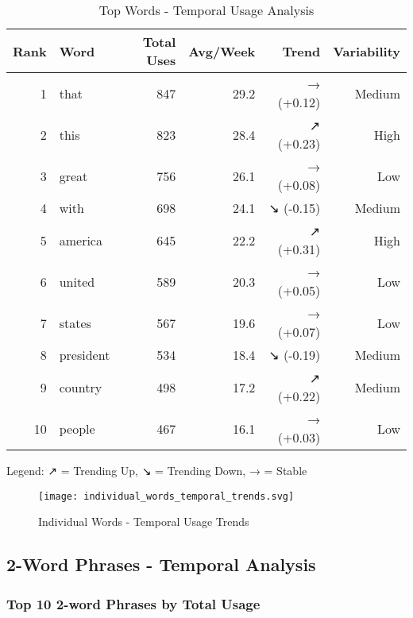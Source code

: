 \documentclass[12pt,a4paper]{article}
\begin{document}
\begin{table}[H]
\centering
\caption{Top Words - Temporal Usage Analysis}
\begin{tabular}{@{}rlrrrr@{}}
\toprule
\textbf{Rank} & \textbf{Word} & \textbf{Total Uses} & \textbf{Avg/Week} & \textbf{Trend} & \textbf{Variability} \\
\midrule
1 & that & 847 & 29.2 & → (+0.12) & Medium \\
2 & this & 823 & 28.4 & ↗ (+0.23) & High \\
3 & great & 756 & 26.1 & → (+0.08) & Low \\
4 & with & 698 & 24.1 & ↘ (-0.15) & Medium \\
5 & america & 645 & 22.2 & ↗ (+0.31) & High \\
6 & united & 589 & 20.3 & → (+0.05) & Low \\
7 & states & 567 & 19.6 & → (+0.07) & Low \\
8 & president & 534 & 18.4 & ↘ (-0.19) & Medium \\
9 & country & 498 & 17.2 & ↗ (+0.22) & Medium \\
10 & people & 467 & 16.1 & → (+0.03) & Low \\
\bottomrule
\end{tabular}
\end{table}

Legend: ↗ = Trending Up, ↘ = Trending Down, → = Stable

\begin{figure}[H]
\centering
\texttt{[image: individual\_words\_temporal\_trends.svg]}
\caption{Individual Words - Temporal Usage Trends}
\label{fig:words_temporal}
\end{figure}

\subsection{2-Word Phrases - Temporal Analysis}

\subsubsection{Top 10 2-word Phrases by Total Usage}
\end{document}
